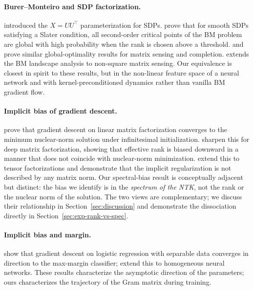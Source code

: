 \documentclass[11pt,letterpaper]{article}
\begin{document}
\paragraph{Burer--Monteiro and SDP factorization.}
\citet{burer2003nonlinear,burer2005local} introduced the
$X = UU^\top$ parameterization for SDPs. \citet{boumal2016non} prove that
for smooth SDPs satisfying a Slater condition, all second-order critical
points of the BM problem are global with high probability when the rank is
chosen above a threshold. \citet{bhojanapalli2016global} and
\citet{ge2016matrix} prove similar global-optimality results for matrix
sensing and completion. \citet{park2017non} extends the BM landscape
analysis to non-square matrix sensing. Our equivalence is closest in
spirit to these results, but in the non-linear feature space of a neural
network and with kernel-preconditioned dynamics rather than vanilla
BM gradient flow.

\paragraph{Implicit bias of gradient descent.}
\citet{gunasekar2017implicit} prove that gradient descent on linear
matrix factorization converges to the minimum nuclear-norm solution under
infinitesimal initialization. \citet{arora2019implicit} sharpen this for
deep matrix factorization, showing that effective rank is biased downward
in a manner that does not coincide with nuclear-norm minimization.
\citet{razin2020implicit} extend this to tensor factorizations and
demonstrate that the implicit regularization is not described by any matrix
norm. Our spectral-bias result is conceptually adjacent but distinct: the
bias we identify is in the \emph{spectrum of the NTK}, not the rank or the
nuclear norm of the solution. The two views are complementary; we discuss
their relationship in Section~\ref{sec:discussion} and demonstrate the
dissociation directly in Section~\ref{sec:exp-rank-vs-spec}.

\paragraph{Implicit bias and margin.}
\citet{soudry2018implicit} show that gradient descent on logistic regression
with separable data converges in direction to the max-margin classifier;
\citet{lyu2019gradient} extend this to homogeneous neural networks. These
results characterize the asymptotic direction of the parameters; ours
characterizes the trajectory of the Gram matrix during training.
\end{document}
